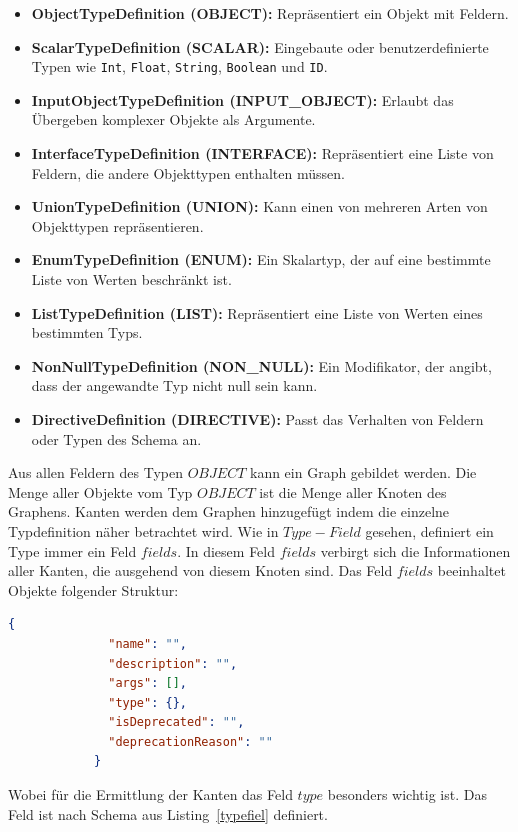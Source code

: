 \begin{itemize}
    \item \textbf{ObjectTypeDefinition (OBJECT):} Repräsentiert ein Objekt mit Feldern.
    \item \textbf{ScalarTypeDefinition (SCALAR):} Eingebaute oder benutzerdefinierte Typen wie \texttt{Int}, \texttt{Float}, \texttt{String}, \texttt{Boolean} und \texttt{ID}.
    \item \textbf{InputObjectTypeDefinition (INPUT\_OBJECT):} Erlaubt das Übergeben komplexer Objekte als Argumente.
    \item \textbf{InterfaceTypeDefinition (INTERFACE):} Repräsentiert eine Liste von Feldern, die andere Objekttypen enthalten müssen.
    \item \textbf{UnionTypeDefinition (UNION):} Kann einen von mehreren Arten von Objekttypen repräsentieren.
    \item \textbf{EnumTypeDefinition (ENUM):} Ein Skalartyp, der auf eine bestimmte Liste von Werten beschränkt ist.
    \item \textbf{ListTypeDefinition (LIST):} Repräsentiert eine Liste von Werten eines bestimmten Typs.
    \item \textbf{NonNullTypeDefinition (NON\_NULL):} Ein Modifikator, der angibt, dass der angewandte Typ nicht null sein kann.
    \item \textbf{DirectiveDefinition (DIRECTIVE):} Passt das Verhalten von Feldern oder Typen des Schema an.
\end{itemize}

Aus allen Feldern des Typen $OBJECT$ kann ein Graph gebildet werden.
Die Menge aller Objekte vom Typ $OBJECT$ ist die Menge aller Knoten des Graphens.
Kanten werden dem Graphen hinzugefügt indem die einzelne Typdefinition näher betrachtet wird.
Wie in $Type-Field$ gesehen, definiert ein Type immer ein Feld $fields$.
In diesem Feld $fields$ verbirgt sich die Informationen aller Kanten, die ausgehend von diesem Knoten sind.
Das Feld $fields$ beeinhaltet Objekte folgender Struktur:

\begin{lstlisting}[language=json, caption={Type-Field},captionpos=b]
            {
              "name": "",
              "description": "",
              "args": [],
              "type": {},
              "isDeprecated": "",
              "deprecationReason": ""
            }
\end{lstlisting}

Wobei für die Ermittlung der Kanten das Feld $type$ besonders wichtig ist.
Das Feld ist nach Schema aus Listing~\ref{typefiel} definiert.

